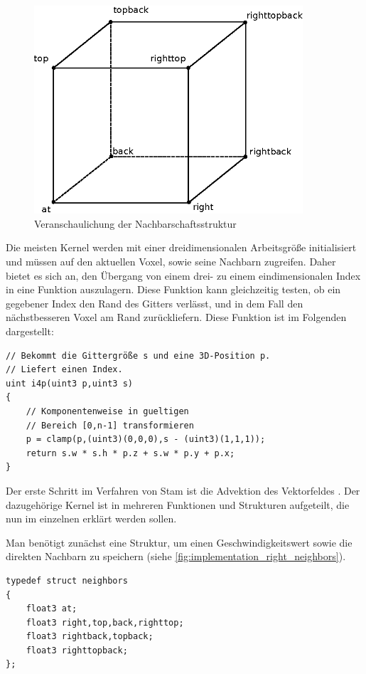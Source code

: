 \begin{figure}[ht]
\centering
\includegraphics[width=10cm]{images/right_neighborhood}
\caption{Veranschaulichung der Nachbarschaftsstruktur }
\label{fig:implementation_right_neighbors}
\end{figure}

Die meisten Kernel werden mit einer dreidimensionalen Arbeitsgröße initialisiert
und müssen auf den aktuellen Voxel, sowie seine Nachbarn zugreifen. Daher bietet
es sich an, den Übergang von einem drei- zu einem eindimensionalen Index in eine
Funktion auszulagern. Diese Funktion kann gleichzeitig testen, ob ein gegebener
Index den Rand des Gitters verlässt, und in dem Fall den nächstbesseren Voxel am
Rand zurückliefern. Diese Funktion  ist im Folgenden
dargestellt:

\begin{lstlisting}
// Bekommt die Gittergröße s und eine 3D-Position p.
// Liefert einen Index.
uint i4p(uint3 p,uint3 s)
{
    // Komponentenweise in gueltigen
    // Bereich [0,n-1] transformieren
    p = clamp(p,(uint3)(0,0,0),s - (uint3)(1,1,1));
    return s.w * s.h * p.z + s.w * p.y + p.x;
}
\end{lstlisting}

Der erste Schritt im Verfahren von Stam ist die Advektion des Vektorfeldes
. Der dazugehörige Kernel ist in mehreren Funktionen
und Strukturen aufgeteilt, die nun im einzelnen erklärt werden sollen.

Man benötigt zunächst eine Struktur, um einen Geschwindigkeitswert sowie die direkten
Nachbarn zu speichern (siehe \autoref{fig:implementation_right_neighbors}).

\begin{lstlisting}
typedef struct neighbors
{
    float3 at;
    float3 right,top,back,righttop;
    float3 rightback,topback;
    float3 righttopback;
};
\end{lstlisting}


